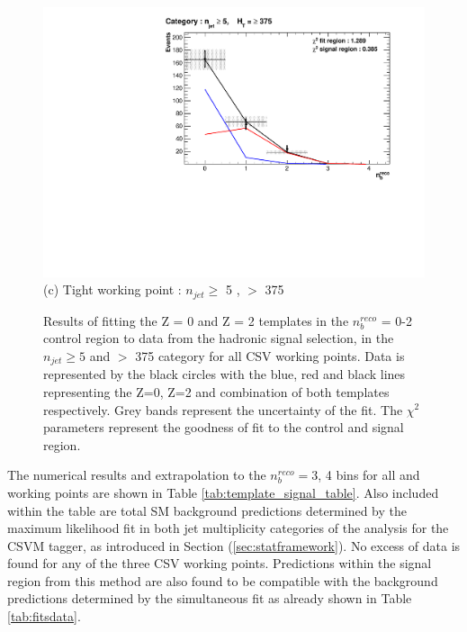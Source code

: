 \begin{figure}[ht]
\begin{minipage}[b]{0.51\linewidth}
\centering
\includegraphics[width = 1.0\linewidth]{plots/TemplatesSignal/Final_Fit_To_Data_Normal_Tight_HTBin_Template_375_jet_mult_5.pdf}
\centering (c) Tight working point :  $n_{jet} \geq$ 5 , \theht $>$ 375 
\end{minipage}
\caption[Results of fitting the Z = 0 and Z = 2 templates in the $n_{b}^{reco}$ = 0-2 control region to data from the hadronic signal selection, in the $n_{jet} \geq 5$ and \theht $>$ 375 category for all \ac{CSV} working points.]{Results of fitting the Z = 0 and Z = 2 templates in the $n_{b}^{reco}$ = 0-2 control region to data from the hadronic signal selection, in the $n_{jet} \geq 5$ and \theht $>$ 375 category for all \ac{CSV} working points. Data is represented by the black circles with the blue, red and black lines representing the Z=0, Z=2 and combination of both templates respectively. Grey bands represent the uncertainty of the fit. The $\chi^{2}$ parameters represent the goodness of fit to the control and signal region.}
\label{fig:template_data_signal_njet5}
\end{figure}
\FloatBarrier
The numerical results and extrapolation to the $n_{b}^{reco} =$3, 4 bins for all \theht and working points are shown in Table \ref{tab:template_signal_table}. Also included within the table are total \ac{SM} background predictions determined by the maximum likelihood fit in both jet multiplicity categories of the \alphat analysis for the \ac{CSVM} tagger, as introduced in Section (\ref{sec:statframework}). No excess of data is found for any of the three \ac{CSV} working points. Predictions within the signal region from this method are also found to be compatible with the background predictions determined by the \alphat simultaneous fit as already shown in Table \ref{tab:fitsdata}.

